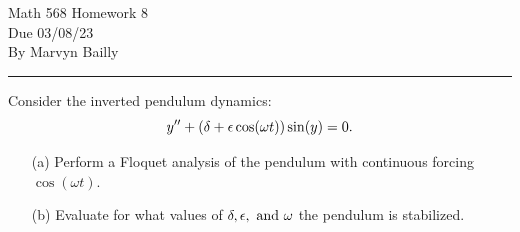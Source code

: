 \documentclass[12pt]{report}
\begin{document}
\large

\begin{center}
 Math 568 Homework 8\\
 Due 03/08/23\\
 By Marvyn Bailly\\
\end{center}

\normalsize

\hrule



\def\w{{\omega}}

\begin{problem}
    Consider the inverted pendulum dynamics:
    \begin{equation*}
        y'' + \paren{\delta + \eps \cos(\w t)}\sin(y) = 0.
    \end{equation*} 
    \begin{enumerate}
        \item[(a)] Perform a Floquet analysis of the pendulum with continuous forcing $\cos(\w t)$. 
        \item[(b)] Evaluate for what values of $\delta, \eps, \and \w$ the pendulum is stabilized.
    \end{enumerate}
\end{problem}
\end{document}
